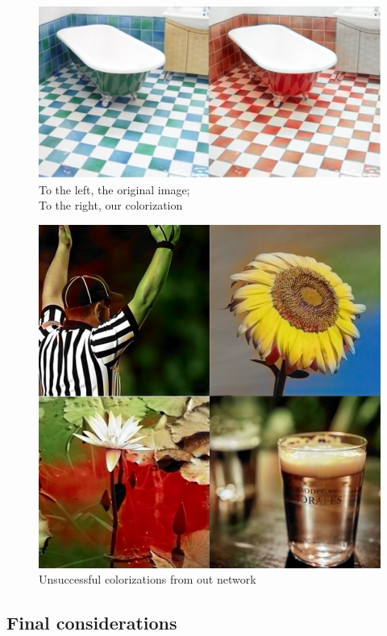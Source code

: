 \documentclass[twoside,twocolumn]{article}
\begin{document}
\begin{figure}
	\includegraphics[width=\linewidth]{img/banio.png}
	\caption{To the left, the original image; \\ To the right, our colorization}
	\label{fig:banio}
\end{figure}

\begin{figure}
	\includegraphics[width=\linewidth]{img/bad.png}
	\caption{Unsuccessful colorizations from out network}
	\label{fig:bad}
\end{figure}

\subsection{Final considerations}
\end{document}
